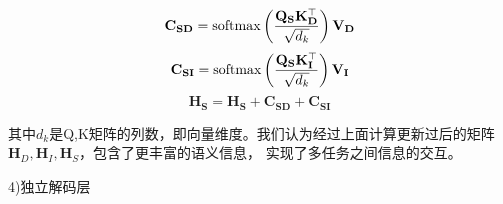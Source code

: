 \begin{equation}
  \mathbf{C}_{\mathbf{SD}}=\operatorname{softmax}\left(\frac{\mathbf{Q}_{\mathbf{S}} \mathbf{K}_{\mathbf{D}}^{\top}}{\sqrt{d_{k}}}\right) \mathbf{V}_{\mathbf{D}}\\
\end{equation}
\begin{equation}
  \mathbf{C}_{\mathbf{SI}}=\operatorname{softmax}\left(\frac{\mathbf{Q}_{\mathbf{S}} \mathbf{K}_{\mathbf{I}}^{\top}}{\sqrt{d_{k}}}\right) \mathbf{V}_{\mathbf{I}}\\
\end{equation}
\begin{equation}
  \mathbf{H}_\mathbf{S}=\mathbf{H}_\mathbf{S}+\mathbf{C}_{\mathbf{SD}}+\mathbf{C}_{\mathbf{SI}}
\end{equation}

其中$d_k$是Q,K矩阵的列数，即向量维度。我们认为经过上面计算更新过后的矩阵$\mathbf{H}_{D},\mathbf{H}_{I},\mathbf{H}_{S}$，包含了更丰富的语义信息，
实现了多任务之间信息的交互。

4)独立解码层

